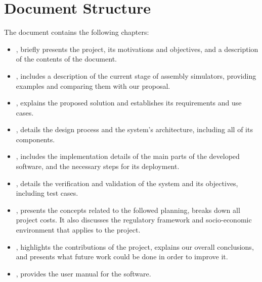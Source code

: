 \section{Document Structure}\label{sec:structure}
The document contains the following chapters:
\begin{itemize}
  \item {}, briefly presents the project, its motivations and objectives, and a description of the contents of the document.
  \item {}, includes a description of the current stage of \gls{assembly} simulators, providing examples and comparing them with our proposal.
  \item {}, explains the proposed solution and establishes its requirements and use cases.
  \item {}, details the design process and the system's architecture, including all of its components.
  \item {}, includes the implementation details of the main parts of the developed software, and the necessary steps for its deployment.
  \item {}, details the verification and validation of the system and its objectives, including test cases.
  \item {}, presents the concepts related to the followed planning, breaks down all project costs. It also discusses the regulatory framework and socio-economic environment that applies to the project.
  \item {}, highlights the contributions of the project, explains our overall conclusions, and presents what future work could be done in order to improve it.
  \item {}, provides the user manual for the software.
\end{itemize}